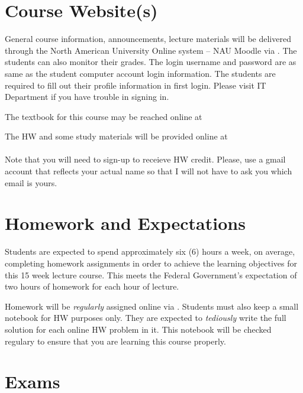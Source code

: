 \documentclass[handout]{ximera}
\begin{document}
\section*{Course Website(s)}

General course information, announcements, lecture materials will be delivered through the North American University Online system – NAU Moodle via . The students can also monitor their grades. The login username and password are as same as the student computer account login information. The students are required to fill out their profile information in first login. Please visit IT Department if you have trouble in signing in.

The textbook for this course may be reached online at 
\\ 

The HW and some study materials will be provided online at 
\\ 
\\
Note that you will need to sign-up to receieve HW credit. Please, use a gmail account that reflects your actual name so that I will not have to ask you which email is yours.

\section*{Homework and Expectations}

Students are expected to spend approximately six (6) hours a week, on average, completing homework assignments in order to achieve the learning objectives for this 15 week lecture course. This meets the Federal Government’s expectation of two hours of homework for each hour of lecture. 

Homework will be {\it regularly} assigned online via . Students must also keep a small notebook for HW purposes only. They are expected to {\it tediously} write the full solution for each online HW problem in it. This notebook will be checked regulary to ensure that you are learning this course properly. 

\section*{Exams}
\end{document}
